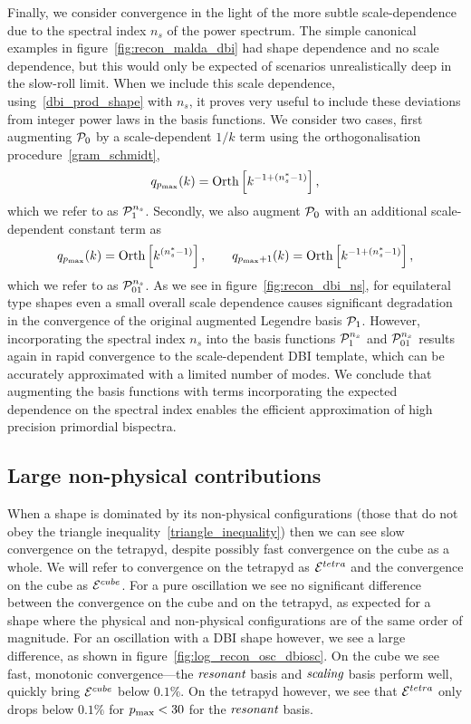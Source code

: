 Finally, we consider convergence in the light of the more subtle scale-dependence due to the spectral index $n_s$ of the power spectrum.  The simple canonical examples in figure~\ref{fig:recon_malda_dbi} had shape dependence and no scale dependence, but this would only be expected of scenarios unrealistically deep in the slow-roll limit.
When we include this scale dependence, using~\eqref{dbi_prod_shape} with $n_s$, 
it proves very useful to include these deviations from
integer power laws in the basis functions.  We consider two cases, first augmenting $\mathcal{P}_0$ by a scale-dependent $1/k$ term using the orthogonalisation procedure~\eqref{gram_schmidt}, 
\begin{align}\label{Lns_inv}
    q_{p_\text{max}}(k) = \text{Orth}\left[{k^{-1+(n_s^{*}-1)}}\right],
\end{align}
which we refer to as $\mathcal{P}^{n_s}_1$.
Secondly, we also augment $\mathcal{P}_0$ with an additional scale-dependent constant term as 
\begin{align}\label{Lns_both}
    q_{p_\text{max}}(k) = \text{Orth}\left[{k^{(n_s^{*}-1)}}\right],\qquad  q_{p_\text{max}\text{$+$}1}(k) = \text{Orth}\left[{k^{-1+(n_s^{*}-1)}}\right],
\end{align}
which we refer to as $\mathcal{P}^{n_s}_{01}$.
As we see in figure~\ref{fig:recon_dbi_ns}, for equilateral type shapes
even a small overall scale dependence causes significant degradation in the convergence of the original augmented Legendre basis $\mathcal{P}_1$.
However, incorporating the spectral index $n_s$  into the basis functions $\mathcal{P}^{n_s}_1$ and $\mathcal{P}^{n_s}_{01}$ results again in rapid convergence to the scale-dependent DBI template, which can be accurately approximated with a limited number of modes.
We conclude that augmenting the basis functions with terms incorporating the expected dependence on the spectral index enables the efficient approximation of high precision primordial bispectra. 
    \subsection{Large non-physical contributions}\label{large_non_physical}
    When a shape is dominated by its non-physical configurations
    (those that do not obey the triangle inequality~\eqref{triangle_inequality})
    then we can see slow convergence on the tetrapyd, despite
    possibly fast convergence on the cube as a whole.
    We will refer to convergence on the tetrapyd as $\mathcal{E}^{tetra}$
    and the convergence on the cube as $\mathcal{E}^{cube}$.
    For a pure oscillation we see no significant difference between the convergence on the cube
    and on the tetrapyd, as expected for a shape where the physical and non-physical
    configurations are of the same order of magnitude.
    For an oscillation with a DBI shape however, we see a large difference,
    as shown in figure~\ref{fig:log_recon_osc_dbiosc}.
    On the cube we see fast, monotonic convergence---the $\textit{resonant}$ basis
    and $\textit{scaling}$ basis perform well, quickly bring $\mathcal{E}^{cube}$
    below $0.1\%$.
    On the tetrapyd however, we see that $\mathcal{E}^{tetra}$ only drops below
    $0.1\%$ for $p_\text{max}<30$ for the $\textit{resonant}$ basis.


